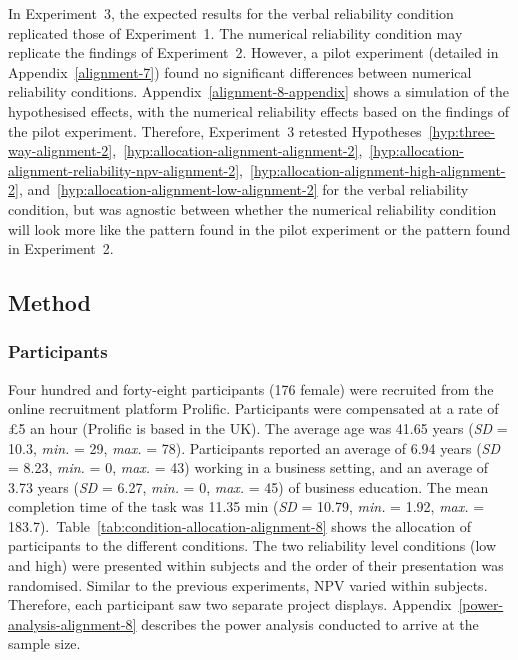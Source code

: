 \documentclass[a4paper, nobind]{templates/ociamthesis}
\theoremstyle{definition}
\theoremstyle{definition}
\theoremstyle{definition}
\theoremstyle{definition}
\theoremstyle{remark}
\begin{document}
In Experiment~3, the expected results for the verbal reliability condition
replicated those of Experiment~1. The numerical reliability condition may
replicate the findings of Experiment~2. However, a pilot experiment (detailed in
Appendix~\ref{alignment-7}) found no significant differences between numerical
reliability conditions. Appendix~\ref{alignment-8-appendix} shows a simulation
of the hypothesised effects, with the numerical reliability effects based on the
findings of the pilot experiment. Therefore, Experiment~3 retested
Hypotheses~\ref{hyp:three-way-alignment-2},~\ref{hyp:allocation-alignment-alignment-2},~\ref{hyp:allocation-alignment-reliability-npv-alignment-2},~\ref{hyp:allocation-alignment-high-alignment-2},
and~\ref{hyp:allocation-alignment-low-alignment-2} for the verbal reliability
condition, but was agnostic between whether the numerical reliability condition
will look more like the pattern found in the pilot experiment or the pattern
found in Experiment~2.

\subsection{Method}

\subsubsection{Participants}

Four hundred and forty-eight participants (176 female) were recruited from the online recruitment platform Prolific. Participants were compensated at a rate of \pounds 5 an hour (Prolific is based in the UK). The average age was 41.65 years (\emph{SD} = 10.3, \emph{min.} = 29, \emph{max.} = 78). Participants reported an average of 6.94 years (\emph{SD} = 8.23, \emph{min.} = 0, \emph{max.} = 43) working in a business setting, and an average of 3.73 years (\emph{SD} = 6.27, \emph{min.} = 0, \emph{max.} = 45) of business education. The mean completion time of the task was 11.35 min (\emph{SD} = 10.79, \emph{min.} = 1.92, \emph{max.} = 183.7).~Table~\ref{tab:condition-allocation-alignment-8}
shows the allocation of participants to the different conditions. The two
reliability level conditions (low and high) were presented within subjects and
the order of their presentation was randomised. Similar to the previous
experiments, NPV varied within subjects. Therefore, each participant saw two
separate project displays. Appendix~\ref{power-analysis-alignment-8} describes
the power analysis conducted to arrive at the sample size.
\end{document}
